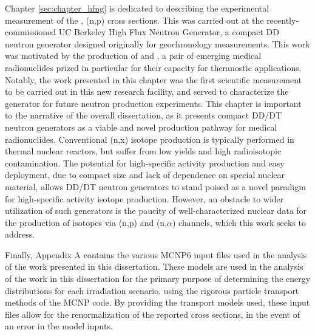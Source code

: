 Chapter \ref{sec:chapter_hfng} is dedicated to describing the experimental measurement of the , (n,p) cross sections.
This was carried out at the recently-commissioned UC Berkeley High Flux Neutron Generator, a compact DD neutron generator designed originally for geochronology measurements.
This work was motivated by the production of   and , a pair of  emerging medical radionuclides prized in particular for their capacity for theranostic applications. 
Notably, the work presented in this chapter was the first scientific measurement to be carried out in this new research facility, and served to characterize the generator for future neutron production experiments.
This chapter is important to the narrative of the overall dissertation, as it presents compact DD/DT neutron generators as a viable and novel production pathway for medical radionuclides.
Conventional (n,x) isotope production is typically performed in thermal nuclear reactors, but suffer from low yields and high radioisotopic contamination. 
The potential for high-specific activity production and easy deployment, due to compact size and lack of dependence on special nuclear material, allows  DD/DT neutron generators to stand poised as a novel paradigm for high-specific activity isotope production.
However, an obstacle to wider utilization of  such generators  is the paucity of well-characterized nuclear data for the production of isotopes via (n,p) and (n,$\alpha$) channels, which this work seeks to address.




Finally, Appendix A  contains the various MCNP6 input files used in the analysis of the work presented in this dissertation. 
These models are  used in the analysis of the work in this dissertation for the primary purpose of determining the energy distributions for each irradiation scenario, using the rigorous particle transport methods of the MCNP code.
By providing the transport models used, these input files allow for the renormalization of the reported cross sections, in the event of an error in the model inputs.


